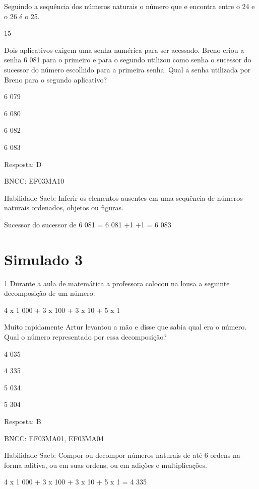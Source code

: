 \begin{escolha}
{\begin{escolha}
{Seguindo a sequência dos números naturais o número que e encontra entre
o 24 e o 26 é o 25.

\num{15}

Dois aplicativos exigem uma senha numérica para ser acessado. Breno
criou a senha 6 081 para o primeiro e para o segundo utilizou como senha
o sucessor do sucessor do número escolhido para a primeira senha. Qual a
senha utilizada por Breno para o segundo aplicativo?

\begin{escolha}
\item
  6 079
\item
  6 080
\item
  6 082
\item
  6 083
\end{escolha}

Resposta: D

BNCC: EF03MA10

Habilidade Saeb: Inferir os elementos ausentes em uma sequência de
números naturais ordenados, objetos ou figuras.

Sucessor do sucessor de 6 081 = 6 081 +1 +1 = 6 083

\chapter{Simulado 3}

\num{1} Durante a aula de matemática a professora colocou na lousa
a seguinte decomposição de um número:

4 x 1 000 + 3 x 100 + 3 x 10 + 5 x 1

Muito rapidamente Artur levantou a mão e disse que sabia qual era o
número. Qual o número representado por essa decomposição?

\begin{escolha}
\item
  4 035
\item
  4 335
\item
  5 034
\item
  5 304
\end{escolha}

Resposta: B

BNCC: EF03MA01, EF03MA04

Habilidade Saeb: Compor ou decompor números naturais de até 6 ordens na
forma aditiva, ou em suas ordens, ou em adições e multiplicações.

4 x 1 000 + 3 x 100 + 3 x 10 + 5 x 1 = 4 335

}
\end{escolha}}
\end{escolha}
